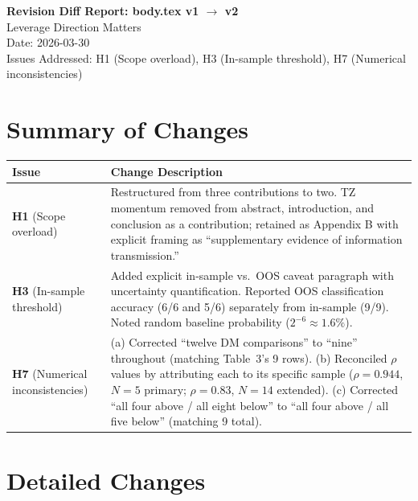 \documentclass[12pt,a4paper]{article}
\begin{document}
\begin{center}
{\Large\bfseries Revision Diff Report: body.tex v1 $\to$ v2}\\[0.5em]
{\large Leverage Direction Matters}\\[0.5em]
{\normalsize Date: 2026-03-30}\\
{\normalsize Issues Addressed: H1 (Scope overload), H3 (In-sample threshold), H7 (Numerical inconsistencies)}
\end{center}

\vspace{1em}

\section*{Summary of Changes}

\begin{tabular}{lp{10cm}}
\toprule
Issue & Change Description \\
\midrule
\textbf{H1} (Scope overload) & Restructured from three contributions to two. TZ momentum removed from abstract, introduction, and conclusion as a contribution; retained as Appendix B with explicit framing as ``supplementary evidence of information transmission.'' \\
\textbf{H3} (In-sample threshold) & Added explicit in-sample vs.\ OOS caveat paragraph with uncertainty quantification. Reported OOS classification accuracy (6/6 and 5/6) separately from in-sample (9/9). Noted random baseline probability ($2^{-6} \approx 1.6\%$). \\
\textbf{H7} (Numerical inconsistencies) & (a) Corrected ``twelve DM comparisons'' to ``nine'' throughout (matching Table~3's 9 rows). (b) Reconciled $\rho$ values by attributing each to its specific sample ($\rho = 0.944$, $N = 5$ primary; $\rho = 0.83$, $N = 14$ extended). (c) Corrected ``all four above / all eight below'' to ``all four above / all five below'' (matching 9 total). \\
\bottomrule
\end{tabular}

\vspace{1em}

\section*{Detailed Changes}
\end{document}
